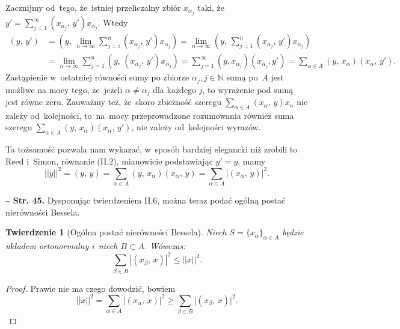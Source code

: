 \documentclass[a4paper,11pt]{article}
\newtheorem{twr}{Twierdzenie} %
\newcommand{\spaceFour}{0.5em}
\newcommand{\tb}{\textbf}
\newcommand{\noi}{\noindent}
\newcommand{\tb}{\textbf}
\newcommand{\noi}{\noindent}
\newcommand{\start}{\noi \tb{--} {}}
\newcommand{\Str}[1]{\tb{Str. #1.}}
\newcommand{\mb}{\mathbb}
\newcommand{\ra}{\rightarrow}
\providecommand{\absj}[1]{\lvert #1 \rvert}
\providecommand{\absd}[1]{\left| #1 \right|}
\providecommand{\absd}[1]{\left| \, #1 \, \right|}
\newcommand{\norm}[1]{\left|\left| #1 \right|\right|}
\newcommand{\al}{\alpha}
\newcommand{\be}{\beta}
\newcommand{\N}{\mb{N}}
\newcommand{\subs}{\subset}
\newcommand{\Lim}{\lim\limits}
\newcommand{\Sum}{\sum\limits}
\newcommand{\SP}[2]{( #1, \, #2 )}  %
\begin{document}
Zacznijmy od~tego, że~istniej przeliczalny zbiór $x_{ \al_{ j } }$
taki,
że~$y' = \Sum_{ j = 1 }^{ \infty } \SP{ x_{ \al_{ j } } }{ y' } x_{
  \al_{ j } }$. Wtedy
\begin{equation*}
  \begin{split}
    \SP{ y }{ y' } &= \SP{ y }{ \Lim_{ n \ra \infty } \Sum_{ j = i }^{
        n } \SP{ x_{ \al_{ j } } }{ y' } x_{ \al_{ j } } } = \Lim_{ n
      \ra \infty } \SP{ y }{ \Sum_{ j = 1 }^{ n } \SP{ x_{ \al_{ j } }
      }
      { y' } x_{ \al_{ j } } } \\
    &= \Lim_{ n \ra \infty } \Sum_{ j = 1 }^{ n } \SP{ y }{ \SP{ x_{
          \al_{ j } } }{ y' } x_{ \al_{ j } } } = \sum_{ j = 1 }^{
      \infty } ( y, x_{ \al_{ j } } ) ( x_{ \al_{ j } }, y' ) = \Sum_{
      \al \in A } \SP{ y }{ x_{ \al } } \SP{ x_{ \al } }{ y' }.
  \end{split}
\end{equation*}
Zastąpienie w~ostatniej równości sumy po zbiorze
$\alpha_{ j }, j \in \N$ sumą po~$A$ jest możliwe na mocy tego,
że~jeżeli $\alpha \neq \alpha_{ j }$ dla każdego $j$, to wyrażenie pod
sumą jest równe zeru. Zauważmy też, że~skoro zbieżność szeregu
$\sum_{ \al \in A } \SP{ x_{ \al } }{ y } x_{ \al }$ nie zależy
od~kolejności, to~na~mocy przeprowadzone rozumowania również suma
szeregu
$\sum_{ \al \in A } \SP{ y }{ x_{ \al } } \SP{ x_{ \al } }{ y' }$, nie
zależy od~kolejności wyrazów.

Ta tożsamość pozwala nam wykazać, w~sposób bardziej elegancki niż
zrobili to Reed i~Simon, równanie (II.2), mianowicie podstawiając
$y' = y$, mamy
\begin{equation*}
  \norm{ y }^{ 2 } = \SP{ y }{ y } = \Sum_{ \al \in A } \SP{ y }{ x_{ \al } }
  \SP{ x_{ \al } }{ y } = \Sum_{ \al \in A } \absj{ \SP{ x_{ \al } }{ y } }^{ 2 }.
\end{equation*}

\vspace{\spaceFour}


\start \Str{45} Dysponując twierdzeniem II.6, można teraz podać ogólną
postać nierówności Bessela.

\begin{twr}[Ogólna postać nierówności Bessela]
  Niech $S = \{ x_{ \al } \}_{ \al \in A }$ będzie układem
  ortonormalny i~niech $B \subs A$. Wówczas:
  \begin{equation*}
    \Sum_{ \be \in B } \absd{ \SP{ x_{ \be }}{ x } }^{ 2 } \leq \norm{ x }^{ 2 }.
  \end{equation*}
\end{twr}
\begin{proof}
  Prawie nie ma czego dowodzić, bowiem
  \begin{equation*}
    \norm{ x }^{ 2 } = \Sum_{ \al \in A } \absd{ \SP{ x_{ \al } }{ x } }^{ 2 }
    \geq \Sum_{ \be \in B } \absj{ \SP{ x_{ \be }}{ x } }^{ 2 }.
  \end{equation*}
\end{proof}
\end{document}

